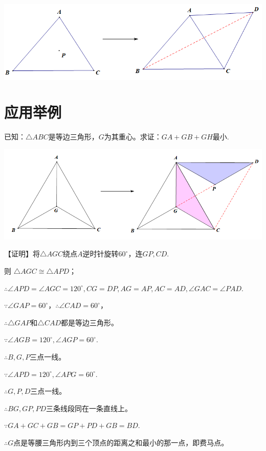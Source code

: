 \documentclass[10pt]{ctexart}
\begin{document}
\begin{center}
	\includegraphics[scale=0.6]{figure/feimadian13}
\end{center}

\section{应用举例}

\begin{shaded}
	\begin{example}
	已知：$\triangle ABC$是等边三角形，$G$为其重心。求证：$GA+GB+GH$最小.
	\end{example}
\end{shaded}

\begin{center}
	\includegraphics[scale=0.5]{figure/feimadian17}
\end{center}

{\kaishu\color{blue}【证明】将$\triangle AGC$绕点$A$逆时针旋转$60^\circ$，连$GP,CD$.
	
	则 $\triangle AGC\cong \triangle APD$；   
	
	$\therefore \angle APD=\angle AGC=120^\circ,CG=DP,AG=AP, AC=AD,\angle GAC=\angle PAD$.
	
	$\because \angle GAP=60^\circ$，$\therefore  \angle CAD=60^\circ$，
	
	$\therefore  \triangle GAP$和$\triangle CAD$都是等边三角形。
	
	$\because \angle AGB=120^\circ, \angle AGP=60^\circ$.
	
	$\therefore  B,G,P$三点一线。
	
	$\because  \angle APD=120^\circ, \angle APG=60^\circ$.
	
	$\therefore   G,P,D$三点一线。
	
	$\therefore  BG,GP,PD$三条线段同在一条直线上。
	
	$\because GA+GC+GB=GP+PD+GB=BD$.
	
	$\therefore G$点是等腰三角形内到三个顶点的距离之和最小的那一点，即费马点。
}
\end{document}
